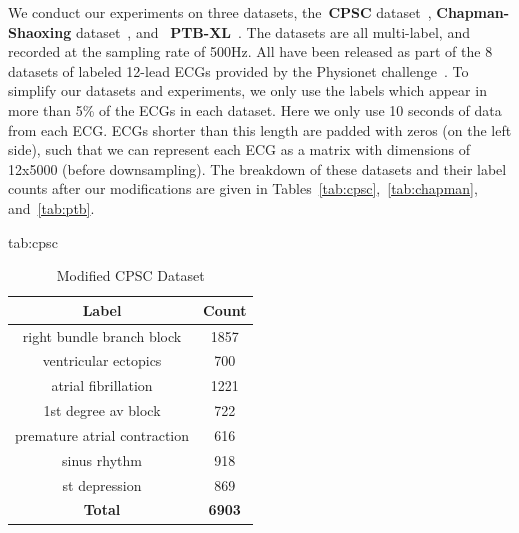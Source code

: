 \documentclass[pmlr,twocolumn]{jmlr}%
\begin{document}
We conduct our experiments on three datasets, the~\textbf{CPSC} dataset~\cite{liu2018open}, \textbf{Chapman-Shaoxing} dataset~\cite{zheng202012}, and ~\textbf{PTB-XL}~\cite{wagner2020ptb}. The datasets are all multi-label, and recorded at the sampling rate of 500Hz. All have been released as part of the 8 datasets of labeled 12-lead ECGs provided by the Physionet challenge~\cite{reyna2021will,reyna4issues}.
To simplify our datasets and experiments, we only use the labels which appear in more than 5\% of the ECGs in each dataset. Here we only use 10 seconds of data from each ECG. ECGs shorter than this length are padded with zeros (on the left side), such that we can represent each ECG as a matrix with dimensions of 12x5000 (before downsampling).
The breakdown of these datasets and their label counts after our modifications are given in Tables~\ref{tab:cpsc},~\ref{tab:chapman}, and~\ref{tab:ptb}.
\begin{table}[tbp]
\floatconts
  {tab:cpsc}%
  {\caption{Modified CPSC Dataset}}%
  {
\begin{tabular}{|c|c|}
 \hline
Label & Count \\
 \hline
right bundle branch block    &  1857 \\
ventricular ectopics         &   700 \\
atrial fibrillation          &  1221 \\
1st degree av block          &   722 \\
premature atrial contraction &   616 \\
sinus rhythm                 &   918 \\
st depression                &   869 \\
 \hline
\textbf{Total} & \textbf{6903}\\
\hline
\end{tabular}
  }
\end{table}
\end{document}
